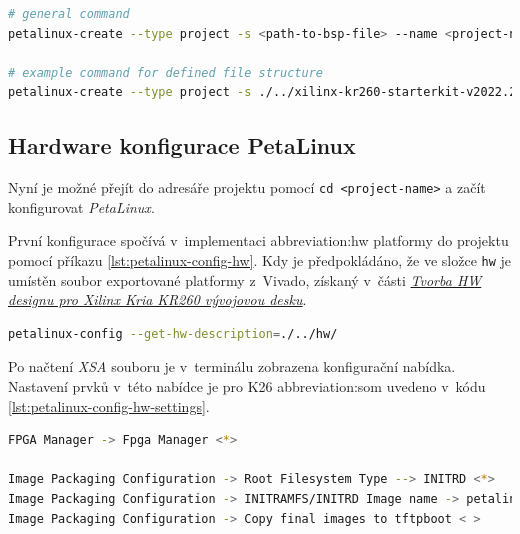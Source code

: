 \documentclass[a4paper, twoside, 11pt]{article}
\newcommand{\fbar}{\FloatBarrier}
\begin{document}
	\begin{lstlisting}[language={sh}, caption={Tvorba PetaLinux projektu ze základního BSP souboru.}, label= {lst:petalinux-create}, morekeywords={petalinux-build, petalinux-package, petalinux-config, petalinux-create}]
# general command
petalinux-create --type project -s <path-to-bsp-file> --name <project-name>

# example command for defined file structure
petalinux-create --type project -s ./../xilinx-kr260-starterkit-v2022.2-10141622.bsp --name petalinux\end{lstlisting}

	\fbar
	\subsection{Hardware konfigurace PetaLinux}
	Nyní je možné přejít do adresáře projektu pomocí \texttt{cd <project-name>} a začít konfigurovat \textit{PetaLinux}.\par
	První konfigurace spočívá v~implementaci \gls{abbreviation:hw} platformy do projektu pomocí příkazu \ref{lst:petalinux-config-hw}. Kdy je předpokládáno, že ve složce \texttt{hw} je umístěn soubor exportované platformy z~Vivado, získaný v~části \hyperref[subsec:tvorba-hw-designu-pro-xilinx-kria-kr260-vyvojovou-desku]{\textit{Tvorba HW designu pro Xilinx Kria KR260 vývojovou desku}}.\par


	\begin{lstlisting}[language={sh}, caption={Konfigurace PetaLinux pomocí XPR souboru z~Vivado.}, label= {lst:petalinux-config-hw}, morekeywords={petalinux-build, petalinux-package, petalinux-config}]
petalinux-config --get-hw-description=./../hw/\end{lstlisting}

	Po načtení \textit{XSA} souboru je v~terminálu zobrazena konfigurační nabídka. Nastavení prvků v~této nabídce je pro K26 \gls{abbreviation:som} uvedeno v~kódu \ref{lst:petalinux-config-hw-settings}.



\begin{lstlisting}[language={sh}, caption={Nastavení v~petalinux-config pro Xilix K26 SOM.}, label= {lst:petalinux-config-hw-settings}]
FPGA Manager -> Fpga Manager <*>

Image Packaging Configuration -> Root Filesystem Type --> INITRD <*>
Image Packaging Configuration -> INITRAMFS/INITRD Image name -> petalinux-initramfs-image <*>
Image Packaging Configuration -> Copy final images to tftpboot < >\end{lstlisting}
\end{document}
